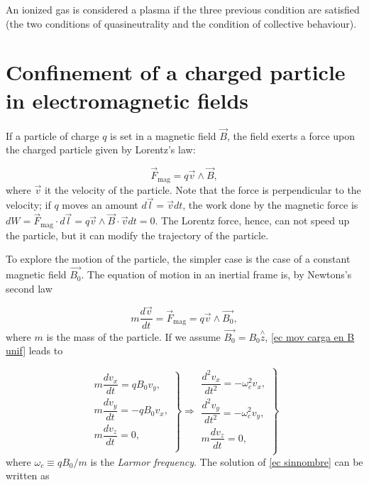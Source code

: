 \documentclass[a4paper,12pt,oneside]{book}
\begin{document}
%
An ionized gas is considered a plasma if the three previous condition are satisfied (the two conditions of quasineutrality and the condition of collective behaviour).



\section[Confinement of a charged particle in electromagnetic fields]{Confinement of a charged particle in electromagnetic fields}
\label{sec_drifts}
If a particle of charge $q$ is set in a magnetic field $\vec{B}$, the field exerts a force upon the charged particle given by Lorentz's law:

\begin{equation}
\vec{F}_\text{mag}=q \vec{v} \wedge \vec{B},
\end{equation}
%
where $\vec{v}$ it the velocity of the particle. Note that the force is perpendicular to the velocity; if $q$ moves an amount $d\vec{l}=\vec{v} dt$, the work done by the magnetic force is $dW=\vec{F}_\text{mag} \cdot d\vec{l}=q \vec{v} \wedge \vec{B} \cdot \vec{v} dt=0$. The Lorentz force, hence, can not speed up the particle, but it can modify the trajectory of the particle. 

To explore the motion of the particle, the simpler case is the case of a constant magnetic field $\vec{B_0}$. The equation of motion in an inertial frame is, by Newtons's second law

\begin{equation} \label{ec mov carga en B unif}
m \dfrac{d \vec{v}}{dt}=\vec{F}_{\text{mag}}=q \vec{v} \wedge \vec{B_0},
\end{equation}
%
where $m$ is the mass of the particle. If we assume $\vec{B_0}=B_0 \stackrel{\wedge}{z}$, \eqref{ec mov carga en B unif} leads to

\begin{equation}\label{ec sinnombre}
\left.
\begin{array}{c}
m \dfrac{d v_x}{dt}=q B_0 v_y, \\
m \dfrac{d v_y}{dt}=-q B_0 v_x, \\
m \dfrac{d v_z}{dt}=0, \\
\end{array}
\right\} 
\Rightarrow
\left.
\begin{array}{c}
\dfrac{d^2 v_x}{dt^2}=-\omega_c^2 v_x, \\
\dfrac{d^2 v_y}{dt^2}=-\omega_c^2 v_y, \\
m \dfrac{d v_z}{dt}=0, \\
\end{array}
\right\} 
\end{equation}
%
where $\omega_c \equiv qB_0/m$ is the \textit{Larmor frequency}. The solution of \eqref{ec sinnombre} can be written as
\end{document}
